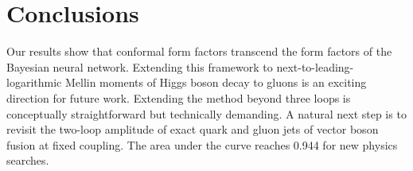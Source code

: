 \section{Conclusions}\label{sec:conclusions}

Our results show that conformal form factors transcend the form factors
of the Bayesian neural network. Extending this framework to
next-to-leading-logarithmic Mellin moments of Higgs boson decay to
gluons is an exciting direction for future work. Extending the method
beyond three loops is conceptually straightforward but technically
demanding. A natural next step is to revisit the two-loop amplitude of
exact quark and gluon jets of vector boson fusion at fixed coupling. The
area under the curve reaches 0.944 for new physics searches.

